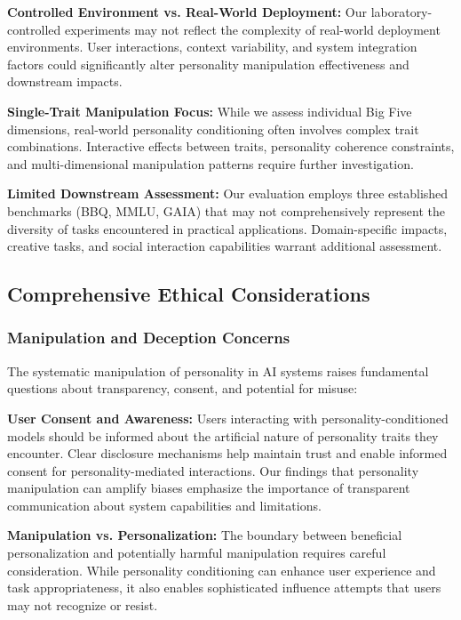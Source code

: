 \textbf{Controlled Environment vs. Real-World Deployment:} Our laboratory-controlled experiments may not reflect the complexity of real-world deployment environments. User interactions, context variability, and system integration factors could significantly alter personality manipulation effectiveness and downstream impacts.

\textbf{Single-Trait Manipulation Focus:} While we assess individual Big Five dimensions, real-world personality conditioning often involves complex trait combinations. Interactive effects between traits, personality coherence constraints, and multi-dimensional manipulation patterns require further investigation.

\textbf{Limited Downstream Assessment:} Our evaluation employs three established benchmarks (BBQ, MMLU, GAIA) that may not comprehensively represent the diversity of tasks encountered in practical applications. Domain-specific impacts, creative tasks, and social interaction capabilities warrant additional assessment.

\subsection{Comprehensive Ethical Considerations}

\subsubsection{Manipulation and Deception Concerns}

The systematic manipulation of personality in AI systems raises fundamental questions about transparency, consent, and potential for misuse:

\textbf{User Consent and Awareness:} Users interacting with personality-conditioned models should be informed about the artificial nature of personality traits they encounter. Clear disclosure mechanisms help maintain trust and enable informed consent for personality-mediated interactions. Our findings that personality manipulation can amplify biases emphasize the importance of transparent communication about system capabilities and limitations.

\textbf{Manipulation vs. Personalization:} The boundary between beneficial personalization and potentially harmful manipulation requires careful consideration. While personality conditioning can enhance user experience and task appropriateness, it also enables sophisticated influence attempts that users may not recognize or resist.

